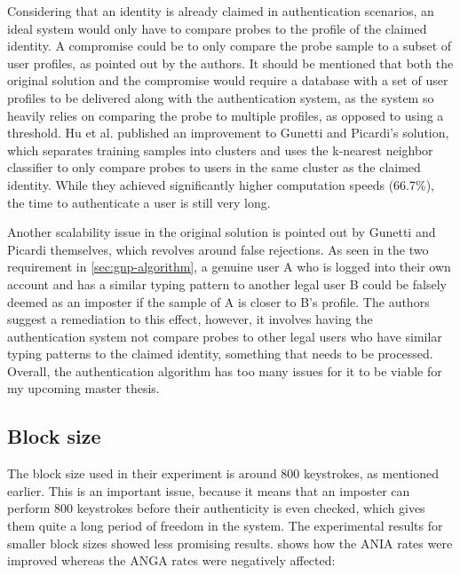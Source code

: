 \documentclass[informationsecurity]{gucmasterproject}
\begin{document}
Considering that an identity is already claimed in authentication scenarios, an ideal system would only have to compare probes to the profile of the claimed identity.
A compromise could be to only compare the probe sample to a subset of user profiles, as pointed out by the authors.
It should be mentioned that both the original solution and the compromise would require a database with a set of user profiles to be delivered along with the authentication system, as the system so heavily relies on comparing the probe to multiple profiles, as opposed to using a threshold.
Hu et al. \cite{hu} published an improvement to Gunetti and Picardi's solution, which separates training samples into clusters and uses the k-nearest neighbor classifier to only compare probes to users in the same cluster as the claimed identity.
While they achieved significantly higher computation speeds (66.7\%), the time to authenticate a user is still very long.

Another scalability issue in the original solution is pointed out by Gunetti and Picardi themselves, which revolves around false rejections.
As seen in the two requirement in \cref{sec:gnp-algorithm}, a genuine user A who is logged into their own account and has a similar typing pattern to another legal user B could be falsely deemed as an imposter if the sample of A is closer to B's profile.
The authors suggest a remediation to this effect, however, it involves having the authentication system not compare probes to other legal users who have similar typing patterns to the claimed identity, something that needs to be processed.
Overall, the authentication algorithm has too many issues for it to be viable for my upcoming master thesis.

\subsection{Block size}
\label{sec:gnp-blocksizes}
The block size used in their experiment is around 800 keystrokes, as mentioned earlier.
This is an important issue, because it means that an imposter can perform 800 keystrokes before their authenticity is even checked, which gives them quite a long period of freedom in the system.
The experimental results for smaller block sizes showed less promising results. 
 shows how the ANIA rates were improved whereas the ANGA rates were negatively affected:
\end{document}
